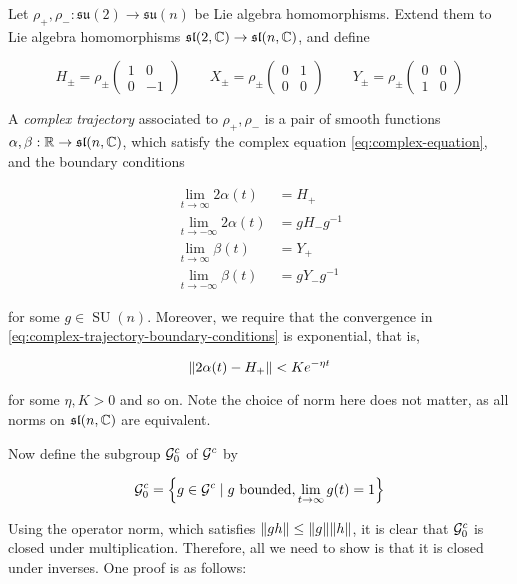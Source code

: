\documentclass{article}
\DeclareMathOperator{\SU}{SU}
\newcommand{\su}{\mathfrak{su}}
\renewcommand{\sl}{\mathfrak{sl}}
\begin{document}
Let \(\rho_+, \rho_- : \su(2) \to \su(n)\) be Lie algebra homomorphisms. Extend them to Lie algebra homomorphisms \(\sl(2, \C) \to \sl(n, \C)\), and define

\[H_{\pm} = \rho_\pm\begin{pmatrix}
    1 & 0 \\
    0 & -1
\end{pmatrix} \qquad X_\pm = \rho_\pm \begin{pmatrix}
    0 & 1 \\
    0 & 0
\end{pmatrix} \qquad Y_\pm = \rho_\pm \begin{pmatrix}
    0 & 0 \\
    1 & 0
\end{pmatrix}\]

\begin{definition}
     A \emph{complex trajectory} associated to \(\rho_+, \rho_-\) is a pair of smooth functions \(\alpha, \beta : \R \to \sl(n, \C)\), which satisfy the complex equation \cref{eq:complex-equation}, and the boundary conditions

    \begin{equation}
        \label{eq:complex-trajectory-boundary-conditions}
        \begin{split}
            \lim_{t \to \infty}2\alpha(t) &= H_+ \\
            \lim_{t \to -\infty}2\alpha(t) &= gH_-g^{-1} \\
            \lim_{t \to \infty}\beta(t) &= Y_+ \\
            \lim_{t \to -\infty}\beta(t) &= gY_-g^{-1}
        \end{split}
    \end{equation}

    for some \(g \in \SU(n)\). Moreover, we require that the convergence in \cref{eq:complex-trajectory-boundary-conditions} is exponential, that is,

    \[\norm{2\alpha(t) - H_+} < Ke^{-\eta t}\]

    for some \(\eta, K > 0\) and so on. Note the choice of norm here does not matter, as all norms on \(\sl(n, \C)\) are equivalent.
\end{definition}

Now define the subgroup \(\mathcal{G}^c_0\) of \(\mathcal{G}^c\) by

\[\mathcal{G}^c_0 = \left\{g \in \mathcal{G}^c \mid g \text{ bounded}, \lim_{t \to \infty}g(t) = 1\right\}\]

Using the operator norm, which satisfies \(\norm{gh} \le \norm{g}\norm{h}\), it is clear that \(\mathcal{G}_0^c\) is closed under multiplication. Therefore, all we need to show is that it is closed under inverses. One proof is as follows:
\end{document}
